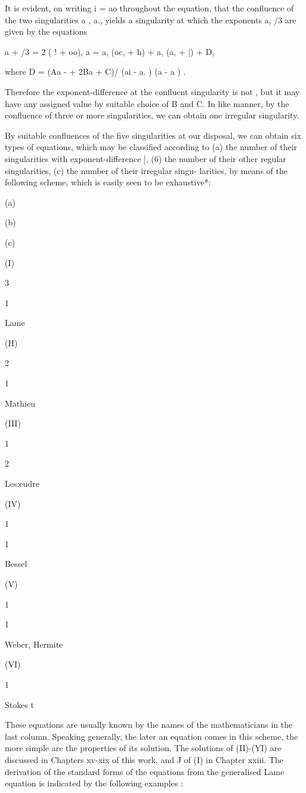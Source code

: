 It is evident, on writing i = ao throughout the equation, that the
confluence of the two singularities a , a., yields a singularity at
which the exponents a, /3 are given by the equations

a + /3 = 2 ( ! + oo), a = a, (oc, + h) + a, (a, + |) + D,

where D = (Aa - + 2Ba + C)/ (ai - a. ) (a - a ) .

Therefore the exponent-difference at the confluent singularity is not
, but it may have any assigned value by suitable choice of B and C. In
like manner, by the confluence of three or more singularities, we can
obtain one irregular singularity.

By suitable confluences of the five singularities at our disposal, we
can obtain six types of equations, which may be classified according
to (a) the number of their singularities with exponent-difference |,
(6) the number of their other regular singularities, (c) the number of
their irregular singu- larities, by means of the following scheme,
which is easily seen to be exhaustive*:

(a)

(b)

(c)

(I)

3

1

Lame

(H)

2

1

Mathieu

(III)

1

2

Les:eudre

(IV)

1

1

Bessel

(V)

1

1

Weber, Hermite

(VI)

1

Stokes t

These equations are usually known by the names of the mathematicians
in the last column. Speaking generally, the later an equation comes in
this scheme, the more simple are the properties of its solution. The
solutions of (II)-(YI) are discussed in Chapters xv-xix of this work,
and J of (I) in Chapter xxiii. The derivation of the standard forms of
the equations from the generalised Lame equation is indicated by the
following examples :

